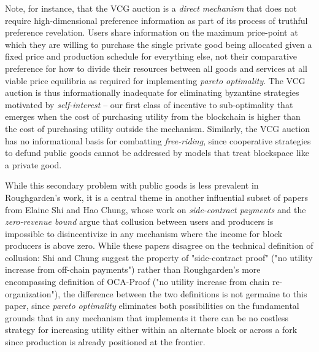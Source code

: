 Note, for instance, that the VCG auction is a \textit{direct mechanism} that does not require high-dimensional preference information as part of its process of truthful preference revelation. Users share information on the maximum price-point at which they are willing to purchase the single private good being allocated given a fixed price and production schedule for everything else, not their comparative preference for how to divide their resources between all goods and services at all viable price equilibria as required for implementing \textit{pareto optimality}. The VCG auction is thus informationally inadequate for eliminating byzantine strategies motivated by \textit{self-interest} -- our first class of incentive to sub-optimality that emerges when the cost of purchasing utility from the blockchain is higher than the cost of purchasing utility outside the mechanism. Similarly, the VCG auction has no informational basis for combatting \textit{free-riding}, since cooperative strategies to defund public goods cannot be addressed by models that treat blockspace like a private good.

While this secondary problem with public goods is less prevalent in Roughgarden's work, it is a central theme in another influential subset of papers from Elaine Shi and Hao Chung, whose work on \textit{side-contract payments} and the \textit{zero-revenue bound} argue that collusion between users and producers is impossible to disincentivize in any mechanism where the income for block producers is above zero. While these papers disagree on the technical definition of collusion: Shi and Chung suggest the property of "side-contract proof" ("no utility increase from off-chain payments") rather than Roughgarden's more encompassing definition of OCA-Proof ("no utility increase from chain re-organization"), the difference between the two definitions is not germaine to this paper, since \textit{pareto optimality} eliminates both possibilities on the fundamental grounds that in any mechanism that implements it there can be no costless strategy for increasing utility either within an alternate block or across a fork since production is already positioned at the frontier.

